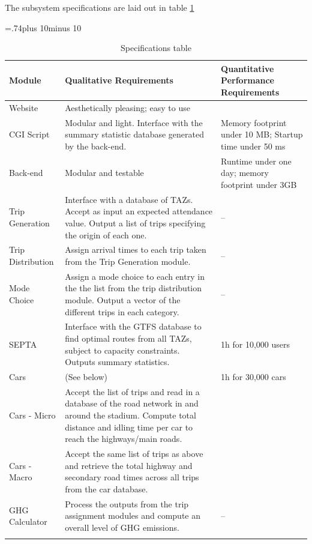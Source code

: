 The subsystem specifications are laid out in table \ref{specs}
\begin{table}[htp]
  \newlength\midcolumnwidth
  \midcolumnwidth=.74\textwidth plus 10\tabcolsep minus 10\tabcolsep
  \centering
  \caption{Specifications table}
  \label{specs}
  \begin{tabular}{%
    >{\raggedright}p{}%
    p{\midcolumnwidth}%
    >{\raggedright\arraybackslash}p{}}
  \firsthline
  \bfseries Module & \bfseries Qualitative Requirements & \bfseries
  Quantitative Performance Requirements \\ \hline
  Website & Aesthetically pleasing; easy to use & \\
  CGI Script& Modular and light. Interface with the summary statistic
  database generated by the back-end. & Memory footprint under 10 MB;
  Startup time under 50 ms \\
  Back-end & Modular and testable & Runtime under one day; memory
  footprint under 3GB \\
  Trip Generation & Interface with a database of TAZs. Accept as input
  an expected attendance value.
  Output a list of trips specifying the origin of each one. &
  -- \\
  Trip Distribution & Assign arrival times to each trip taken from the
  Trip Generation module. & -- \\
  Mode Choice & Assign a mode choice to each entry in the the list
  from the trip distribution module.
  Output a vector of the different trips in each category. & -- \\
  SEPTA & Interface with the GTFS database to find optimal routes from
  all TAZs, subject to capacity constraints. Outputs summary
  statistics. & 1h for 10,000 users \\
  Cars & (See below) & 1h for 30,000 cars \\
  Cars - Micro & Accept the list of trips and read in a database of
  the road network in and around the stadium. Compute total distance
  and idling time per car to reach the highways/main roads. & \\
  Cars - Macro & Accept the same list of trips as above and retrieve
  the total highway and secondary road times across all trips from the
  car database. & \\
  GHG Calculator & Process the outputs from the trip assignment
  modules and compute an overall level of GHG emissions. & --  \\
  \lasthline
  \end{tabular}
\end{table}

